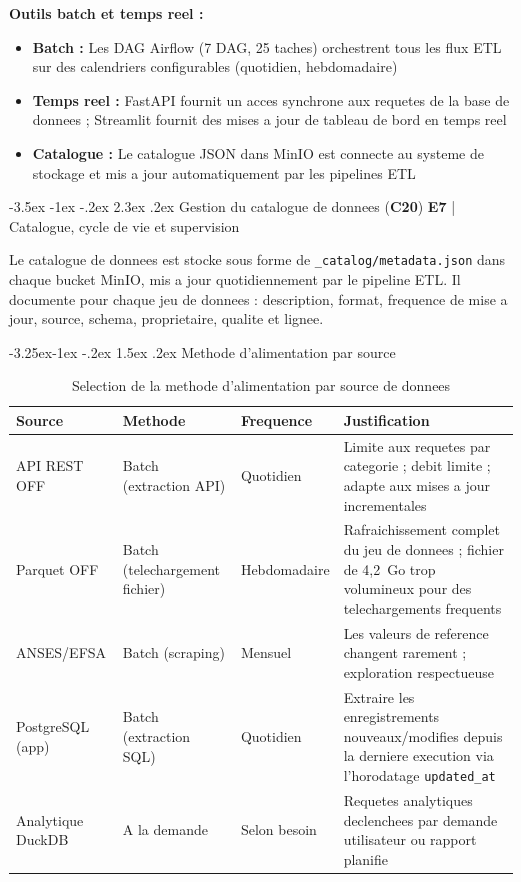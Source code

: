 \documentclass[a4paper,11pt,oneside,openany]{report}
\makeatletter
\renewcommand\section{\@startsection{section}{1}{\z@}%
  {-3.5ex \@plus -1ex \@minus -.2ex}%
  {2.3ex \@plus.2ex}%
  {\normalfont\Large\bfseries\color{ntgreen}}}
\renewcommand\subsection{\@startsection{subsection}{2}{\z@}%
  {-3.25ex\@plus -1ex \@minus -.2ex}%
  {1.5ex \@plus .2ex}%
  {\normalfont\large\bfseries\color{ntdarkgreen}}}
\newcommand{\competence}[1]{\textbf{\textcolor{ntgreen}{#1}}}
\newcommand{\evaluation}[1]{\textbf{\textcolor{ntblue}{#1}}}
\makeatother
\begin{document}
\textbf{Outils batch et temps reel :}
\begin{itemize}[nosep]
  \item \textbf{Batch :} Les DAG Airflow (7 DAG, 25 taches) orchestrent tous
        les flux ETL sur des calendriers configurables (quotidien, hebdomadaire)
  \item \textbf{Temps reel :} FastAPI fournit un acces synchrone aux requetes
        de la base de donnees ; Streamlit fournit des mises a jour de tableau
        de bord en temps reel
  \item \textbf{Catalogue :} Le catalogue JSON dans MinIO est connecte au
        systeme de stockage et mis a jour automatiquement par les pipelines ETL
\end{itemize}


\section{Gestion du catalogue de donnees (\competence{C20})}
\label{sec:c20}
{\small\evaluation{E7} | Catalogue, cycle de vie et supervision}

Le catalogue de donnees est stocke sous forme de
\texttt{\_catalog/metadata.json} dans chaque bucket MinIO, mis a jour
quotidiennement par le pipeline ETL. Il documente pour chaque jeu de
donnees : description, format, frequence de mise a jour, source, schema,
proprietaire, qualite et lignee.

\subsection{Methode d'alimentation par source}

\begin{table}[H]
\centering
\caption{Selection de la methode d'alimentation par source de donnees}
\label{tab:feed-methods}
\begin{tabularx}{\textwidth}{L{2.5cm} L{2cm} L{3cm} L{5cm}}
\toprule
\textbf{Source} & \textbf{Methode} & \textbf{Frequence} & \textbf{Justification} \\
\midrule
API REST OFF & Batch (extraction API) & Quotidien & Limite aux requetes par categorie ; debit limite ; adapte aux mises a jour incrementales \\
Parquet OFF & Batch (telechargement fichier) & Hebdomadaire & Rafraichissement complet du jeu de donnees ; fichier de 4,2~Go trop volumineux pour des telechargements frequents \\
ANSES/EFSA & Batch (scraping) & Mensuel & Les valeurs de reference changent rarement ; exploration respectueuse \\
PostgreSQL (app) & Batch (extraction SQL) & Quotidien & Extraire les enregistrements nouveaux/modifies depuis la derniere execution via l'horodatage \texttt{updated\_at} \\
Analytique DuckDB & A la demande & Selon besoin & Requetes analytiques declenchees par demande utilisateur ou rapport planifie \\
\bottomrule
\end{tabularx}
\end{table}
\end{document}
